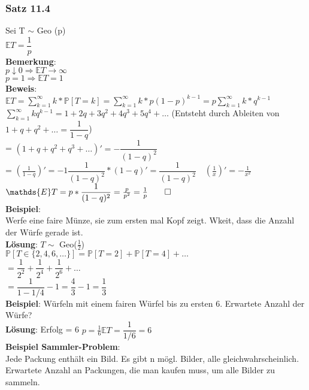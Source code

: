 \subsubsection{Satz 11.4}
Sei T $\sim$ Geo (p) \\
$\mathds{E}T=\dfrac{1}{p}$ \\
\textbf{Bemerkung}:\\
$p\downarrow0 \Rightarrow \mathds{E}T \rightarrow\infty $\\
$p=1 \Rightarrow\mathds{E}T=1$\medskip\\
\textbf{Beweis}: \\
$\mathds{E}T=\sum_{k=1}^\infty k*\mathds{P}[T=k]=\sum_{k=1}^\infty k*p(1-p)^{k-1}=p\sum_{k=1}^\infty k*q^{k-1}$\medskip\\
$\sum_{k=1}^\infty kq^{k-1}=1+2q+3q^2+4q^3+5q^4+\dots$ (Entsteht durch Ableiten von $1+q+q^2+\dots = \dfrac{1}{1-q} $)\smallskip\\
= $( 1+q+q^2+q^3+\dots)'=-\dfrac{1}{(1-q)^2}$\smallskip\\
= $(\frac{1}{1-q})'=-1\dfrac{1}{(1-q)^2}*(1-q)'=\dfrac{1}{(1-q)^2} \quad (\frac{1}{x})' =-\frac{1}{x^2}$\medskip\\
$\mathds{E}T = p*\dfrac{1}{(1-q)^2} = \frac{p}{p^2}=\frac{1}{p} \qed$\medskip\\
\textbf{Beispiel}:\\
Werfe eine faire Münze, sie zum ersten mal Kopf zeigt. Wkeit, dass die Anzahl der Würfe gerade ist.\medskip\\
\textbf{Lösung}: $T \sim $ Geo($\frac{1}{2}$) \\
$\mathds{P}[T\in \{2,4,6,\dots\}] = \mathds{P}[T=2]+\mathds{P}[T=4] + \dots$\smallskip\\
$=\dfrac{1}{2^2}+\dfrac{1}{2^4}+\dfrac{1}{2^6}+\dots$\smallskip\\
$=\dfrac{1}{1- 1/4}-1= \dfrac{4}{3}-1=\dfrac{1}{3}$\bigskip\\
\textbf{Beispiel}: Würfeln mit einem fairen Würfel bis zu ersten 6. Erwartete Anzahl der Würfe?\medskip\\
\textbf{Lösung}:  Erfolg = 6 \hspace{1cm} $p=\frac{1}{6} \mathds{E}T=\dfrac{1}{1/6}=6$\medskip\\
\textbf{Beispiel Sammler-Problem}:\\
Jede Packung enthält ein Bild. Es gibt n mögl. Bilder, alle gleichwahrscheinlich.\\
Erwartete Anzahl an Packungen, die man kaufen muss, um alle Bilder zu sammeln. \medskip\\
